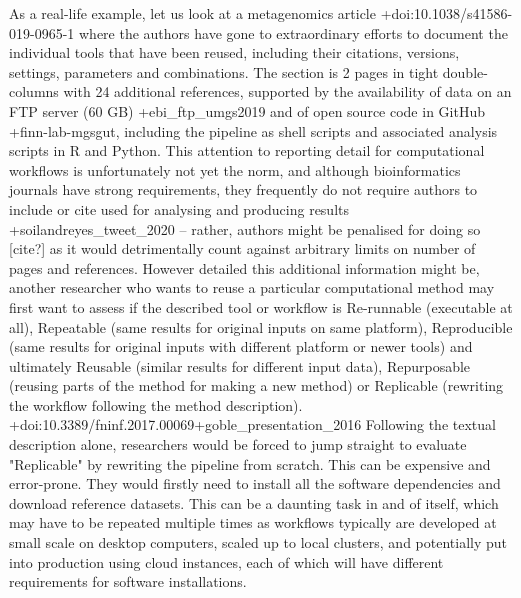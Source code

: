 {}As a real-life example, let us look at a metagenomics article +{}{}{doi:10.1038/s41586-019-0965-1} where the authors have gone to extraordinary efforts to document the individual tools that have been reused, including their citations, versions, settings, parameters and combinations. The  section is 2 pages in tight double-columns with 24 additional references, supported by the availability of data on an FTP server (60 GB) +{}{}{ebi_ftp_umgs2019} and of open source code in GitHub  +{}{}{finn-lab-mgsgut}, including the pipeline as shell scripts and associated analysis scripts in R and Python.\markdownRendererInterblockSeparator
{}This attention to reporting detail for computational workflows is unfortunately not yet the norm, and although bioinformatics journals have strong  requirements, they frequently do not require authors to include or cite  used for analysing and producing results +{}{}{soilandreyes_tweet_2020} – rather, authors might be penalised for doing so [cite?] as it would detrimentally count against arbitrary limits on number of pages and references.\markdownRendererInterblockSeparator
{}However detailed this additional information might be, another researcher who wants to reuse a particular computational method may first want to assess if the described tool or workflow is Re-runnable (executable at all), Repeatable (same results for original inputs on same platform), Reproducible (same results for original inputs with different platform or newer tools) and ultimately Reusable (similar results for different input data), Repurposable (reusing parts of the method for making a new method) or Replicable (rewriting the workflow following the method description). +{}{}{doi:10.3389/fninf.2017.00069}+{}{}{goble_presentation_2016}\markdownRendererInterblockSeparator
{}Following the textual description alone, researchers would be forced to jump straight to evaluate "Replicable" by rewriting the pipeline from scratch. This can be expensive and error-prone. They would firstly need to install all the software dependencies and download reference datasets. This can be a daunting task in and of itself, which may have to be repeated multiple times as workflows typically are developed at small scale on desktop computers, scaled up to local clusters, and potentially put into production using cloud instances, each of which will have different requirements for software installations.\markdownRendererInterblockSeparator
